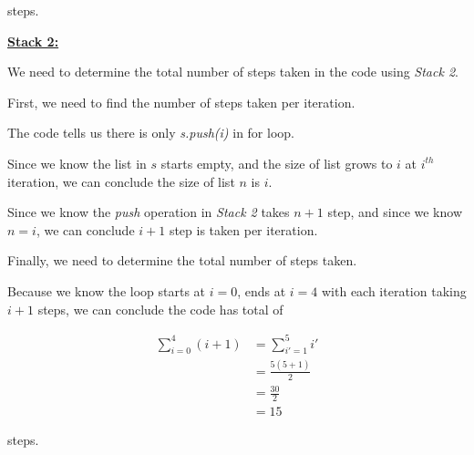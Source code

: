 \documentclass[12pt]{article}
\begin{document}
\begin{enumerate}[a.]
    steps.

    \bigskip

    \underline{\textbf{Stack 2:}}

    \bigskip

    We need to determine the total number of steps taken in the code using \textit{Stack 2}.

    \bigskip

    First, we need to find the number of steps taken per iteration.

    \bigskip

    The code tells us there is only \textit{s.push(i)} in for loop.

    \bigskip

    Since we know the list in $s$ starts empty, and the size of list grows to $i$ at $i^{th}$
    iteration, we can conclude the size of list $n$ is $i$.

    \bigskip

    Since we know the \textit{push} operation in \textit{Stack 2} takes $n+1$ step,
    and since we know $n = i$, we can conclude $i+1$ step is taken per iteration.

    \bigskip

    Finally, we need to determine the total number of steps taken.

    \bigskip

    Because we know the loop starts at $i = 0$, ends at $i = 4$ with each iteration
    taking $i+1$ steps, we can conclude the code has total of

    \setcounter{equation}{0}
    \begin{align}
        \sum\limits_{i=0}^4 (i+1) &= \sum\limits_{i'=1}^5 i'\\
        &= \frac{5(5+1)}{2}\\
        &= \frac{30}{2}\\
        &= 15
    \end{align}

    steps.


\end{enumerate}
\end{document}
